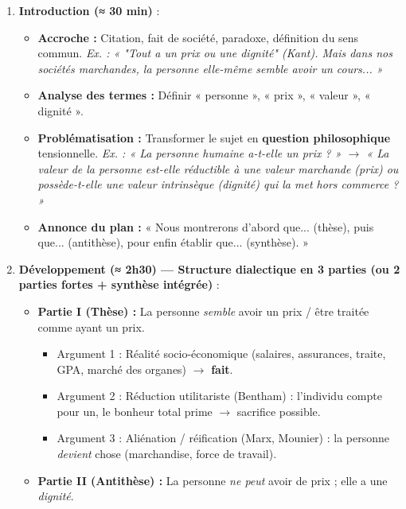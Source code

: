 \documentclass[11pt]{article}
\begin{document}
\begin{methode}
\begin{enumerate}
    \item \textbf{Introduction (≈ 30 min)} :
        \begin{itemize}
            \item \textbf{Accroche :} Citation, fait de société, paradoxe, définition du sens commun. \emph{Ex. : « "Tout a un prix ou une dignité" (Kant). Mais dans nos sociétés marchandes, la personne elle-même semble avoir un cours... »}
            \item \textbf{Analyse des termes :} Définir « personne », « prix », « valeur », « dignité ».
            \item \textbf{Problématisation :} Transformer le sujet en \textbf{question philosophique} tensionnelle. \emph{Ex. : « La personne humaine a-t-elle un prix ? » $\rightarrow$ « La valeur de la personne est-elle réductible à une valeur marchande (prix) ou possède-t-elle une valeur intrinsèque (dignité) qui la met hors commerce ? »}
            \item \textbf{Annonce du plan :} « Nous montrerons d'abord que... (thèse), puis que... (antithèse), pour enfin établir que... (synthèse). »
        \end{itemize}
    \item \textbf{Développement (≈ 2h30) — Structure dialectique en 3 parties (ou 2 parties fortes + synthèse intégrée)} :
        \begin{itemize}
            \item \textbf{Partie I (Thèse) :} La personne \emph{semble} avoir un prix / être traitée comme ayant un prix.
                \begin{itemize}
                    \item Argument 1 : Réalité socio-économique (salaires, assurances, traite, GPA, marché des organes) $\rightarrow$ \textbf{fait}.
                    \item Argument 2 : Réduction utilitariste (Bentham) : l'individu compte pour un, le bonheur total prime $\rightarrow$ sacrifice possible.
                    \item Argument 3 : Aliénation / réification (Marx, Mounier) : la personne \emph{devient} chose (marchandise, force de travail).
                \end{itemize}
            \item \textbf{Partie II (Antithèse) :} La personne \emph{ne peut} avoir de prix ; elle a une \emph{dignité}.

\end{itemize}
\end{enumerate}
\end{methode}
\end{document}
